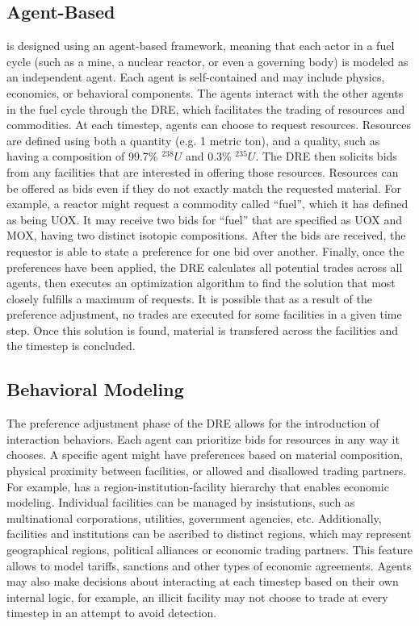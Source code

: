 \subsection{Agent-Based}
\Cyclus is designed using an agent-based framework, meaning that each actor in a fuel cycle (such as a mine, a nuclear reactor, or even a governing body) is modeled as an independent agent\cite{jennings_agent-based_2000, taylor2014agent}. Each agent is self-contained and may include physics, economics, or behavioral components\cite{huff_open_2011,gidden_agent-based_2013,gidden_agent-based_2015}.  The agents interact with the other agents in the fuel cycle through the \gls{DRE}, which facilitates the trading of resources and commodities\cite{gidden_agent-based_2014}.  At each timestep, agents can choose to request resources.  Resources are defined using both a quantity (e.g. 1 metric ton), and a quality, such as having a composition of 99.7\% $^{238}U$ and 0.3\% $^{235}U$.  The \gls{DRE} then solicits bids from any facilities that are interested in offering those resources. Resources can be offered as bids even if they do not exactly match the requested material. For example, a reactor might request a commodity called ``fuel'', which it has defined as being \gls{UOX}.  It may receive two bids for ``fuel'' that are specified as \gls{UOX} and \gls{MOX}, having two distinct isotopic compositions. After the bids are received, the requestor is able to state a preference for one bid over another. Finally, once the preferences have been applied, the \gls{DRE} calculates all potential trades across all agents, then executes an optimization algorithm to find the solution that most closely fulfills a maximum of requests. It is possible that as a result of the preference adjustment, no trades are executed for some facilities in a given time step.  Once this solution is found, material is transfered across the facilities and the timestep is concluded.

\subsection{Behavioral Modeling}
The preference adjustment phase of the \gls{DRE} allows for the introduction of interaction behaviors.  Each agent can prioritize bids for resources in any way it chooses. A specific agent might have preferences based on material composition, physical proximity between facilities, or allowed and disallowed trading partners. For example, \Cyclus has a region-institution-facility hierarchy that enables economic modeling\cite{oliver_geniusv2:_2009}.  Individual facilities can be managed by insistutions, such as multinational corporations, utilities, government agencies, etc.  Additionally, facilities and institutions can be ascribed to distinct regions, which may represent geographical regions, political alliances or economic trading partners. This feature allows \Cyclus to model tariffs, sanctions and other types of economic agreements.    Agents may also make decisions about interacting at each timestep based on their own internal logic, for example, an illicit facility may not choose to trade at every timestep in an attempt to avoid detection. 

